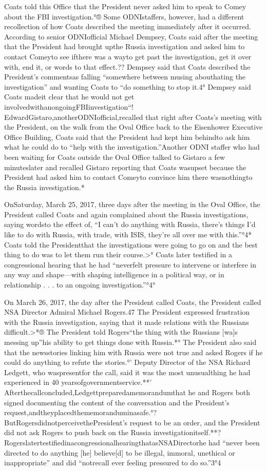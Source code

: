 Coats told this Office that the President never asked him to speak to Comey about the FBI investigation.°® Some ODNIstaffers, however, had a different recollection of how Coats described the meeting immediately after it occurred. According to senior ODNIofficial Michael Dempsey, Coats said after the meeting that the President had brought upthe Russia investigation and asked him to contact Comeyto see ifthere was a wayto get past the investigation, get it over with, end it, or words to that effect.?? Dempsey said that Coats described the President’s commentsas falling “somewhere between musing abouthating the investigation” and wanting Coats to “do something to stop it.4° Dempsey said Coats madeit clear that he would not get involvedwithanongoingFBIinvestigation“! EdwardGistaro,anotherODNIofficial,recalled that right after Coats’s meeting with the President, on the walk from the Oval Office back to the Eisenhower Executive Office Building, Coats said that the President had kept him behindto ask him what he could do to “help with the investigation.”Another ODNI staffer who had been waiting for Coats outside the Oval Office talked to Gistaro a few minuteslater and recalled Gistaro reporting that Coats wasupset because the President had asked him to contact Comeyto convince him there wasnothingto the Russia investigation.*

OnSaturday, March 25, 2017, three days after the meeting in the Oval Office, the President called Coats and again complained about the Russia investigations, saying wordsto the effect of, “I can’t do anything with Russia, there’s things I’d like to do with Russia, with trade, with ISIS, they’re all over me with this.”°4* Coats told the Presidentthat the investigations were going to go on and the best thing to do was to let them run their course.>° Coats later testified in a congressional hearing that he had “neverfelt pressure to intervene or interfere in any way and shape—with shaping intelligence in a political way, or in relationship . . . to an ongoing investigation.”°4°

On March 26, 2017, the day after the President called Coats, the President called NSA Director Admiral Michael Rogers.47 The President expressed frustration with the Russia investigation, saying that it made relations with the Russians difficult.>*® The President told Rogers“the thing with the Russians [wa]s messing up”his ability to get things done with Russia.*° The President also said that the newsstories linking him with Russia were not true and asked Rogers if he could do anything to refute the stories.°’ Deputy Director of the NSA Richard Ledgett, who waspresentfor the call, said it was the most unusualthing he had experienced in 40 yearsofgovernmentservice.**' Afterthecallconcluded,Ledgettpreparedamemorandumthat he and Rogers both signed documenting the content of the conversation and the President’s request,andtheyplacedthememoranduminasafe.°? ButRogersdidnotperceivethePresident’s request to be an order, and the President did not ask Rogers to push back on the Russia investigationitself.**? RogerslatertestifiedinacongressionalhearingthatasNSADirectorhe had “never been directed to do anything [he] believe[d] to be illegal, immoral, unethical or inappropriate” and did “notrecall ever feeling pressured to do so.”3°4

